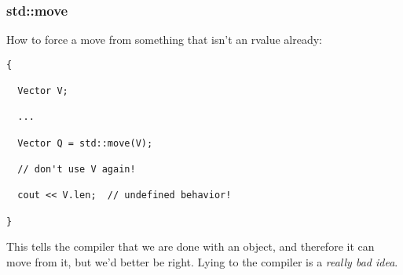 




\begin{frame}[fragile]
\frametitle{std::move}
How to force a move from something that isn't an rvalue already:
{\scriptsize
\begin{verbatim}
{

  Vector V;

  ...

  Vector Q = std::move(V);

  // don't use V again!

  cout << V.len;  // undefined behavior!

}
\end{verbatim}
}

This tells the compiler that we are done with an object, and therefore
it can move from it, but we'd better be right.  Lying to the compiler
is a \emph{really bad idea}.


\end{frame}



